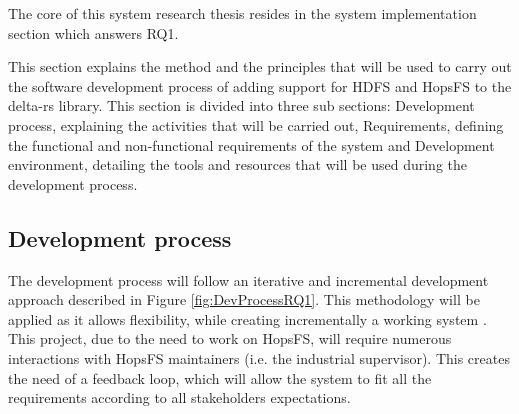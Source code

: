 The core of this system research thesis resides in the system implementation section which answers RQ1.

This section explains the method and the principles that will be used to carry out the software development process of adding support for \gls{HDFS} and \gls{HopsFS} to the delta-rs library. This section is divided into three sub sections: Development process, explaining the activities that will be carried out, Requirements, defining the functional and non-functional requirements of the system and Development environment, detailing the tools and resources that will be used during the development process.

\subsection{Development process}
The development process will follow an iterative and incremental development approach described in Figure \ref{fig:DevProcessRQ1}. This methodology will be applied as it allows flexibility, while creating incrementally a working system \cite{despa2014comparative}. This project, due to the need to work on \gls{HopsFS}, will require numerous interactions with \gls{HopsFS} maintainers (i.e. the industrial supervisor). This creates the need of a feedback loop, which will allow the system to fit all the requirements according to all stakeholders expectations.

